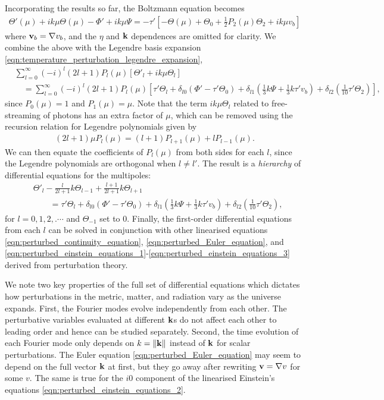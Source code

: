 Incorporating the results so far, the Boltzmann equation becomes 
\begin{align}
	\Theta'(\mu) + ik\mu \Theta(\mu) - \Phi' + ik\mu\Psi = -\tau' \left[ - \Theta(\mu) + \Theta_0 + \frac{1}{2}P_2(\mu)\Theta_2 + ik\mu v_b \right]
\end{align}
where $\mathbf{v}_b = \nabla v_b$, and the $\eta$ and $\mathbf{k}$ dependences are omitted for clarity. We combine the above with the Legendre basis expansion \eqref{eqn:temperature_perturbation_legendre_expansion}, 
\begin{align}
	&\sum_{l=0}^{\infty} (-i)^l (2l+1) P_l (\mu) \left[ \Theta'_l + ik\mu \Theta_l \right] \nonumber\\
	&\quad= \sum_{l=0}^{\infty} (-i)^l (2l+1) P_l (\mu) \left[ \tau' \Theta_l + \delta_{l0} (\Phi' - \tau'\Theta_0) + \delta_{l1} (\frac{1}{3}k\Psi + \frac{1}{3}k\tau' v_b) + \delta_{l2}(\frac{1}{10}\tau' \Theta_2) \right],
\end{align}
since $P_0(\mu) = 1$ and $P_1(\mu)=\mu$. Note that the term $ik\mu \Theta_l$ related to free-streaming of photons has an extra factor of $\mu$, which can be removed using the recursion relation for Legendre polynomials given by
\begin{align}
	(2l+1)\mu P_l(\mu) = (l+1) P_{l+1} (\mu) + l P_{l-1} (\mu).
\end{align}
We can then equate the coefficients of $P_l(\mu)$ from both sides for each $l$, since the Legendre polynomials are orthogonal when $l\neq l'$. The result is a \textit{hierarchy} of differential equations for the multipoles:
\begin{align}
	&\Theta'_l - \frac{l}{2l+1} k\Theta_{l-1} + \frac{l+1}{2l+1} k\Theta_{l+1}  \nonumber\\
	&\qquad= \tau' \Theta_l + \delta_{l0} (\Phi' - \tau' \Theta_0) + \delta_{l1} (\frac{1}{3} k\Psi + \frac{1}{3} k\tau' v_b) + \delta_{l2}(\frac{1}{10}\tau' \Theta_2),
\end{align}
for $l=0,1,2,.\cdots$ and $\Theta_{-1}$ set to $0$. Finally, the first-order differential equations from each $l$ can be solved in conjunction with other linearised equations \eqref{eqn:perturbed_continuity_equation}, \eqref{eqn:perturbed_Euler_equation}, and \eqref{eqn:perturbed_einstein_equations_1}-\eqref{eqn:perturbed_einstein_equations_3} derived from perturbation theory.

We note two key properties of the full set of differential equations which dictates how perturbations in the metric, matter, and radiation vary as the universe expands. First, the Fourier modes evolve independently from each other. The perturbative variables evaluated at different $\mathbf{k}$s do not affect each other to leading order and hence can be studied separately. Second, the time evolution of each Fourier mode only depends on $k=\|\mathbf{k}\|$ instead of $\mathbf{k}$ for scalar perturbations. The Euler equation \eqref{eqn:perturbed_Euler_equation} may seem to depend on the full vector $\mathbf{k}$ at first, but they go away after rewriting $\mathbf{v}=\nabla v$ for some $v$. The same is true for the $i0$ component of the linearised Einstein's equations \eqref{eqn:perturbed_einstein_equations_2}. 

